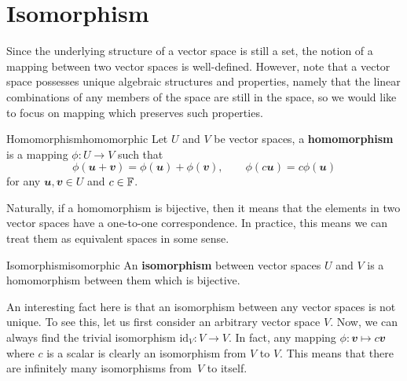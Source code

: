 \documentclass[math, code]{amznotes}
\theoremstyle{remark}
\begin{document}
\section{Isomorphism}
Since the underlying structure of a vector space is still a set, the notion of a mapping between two vector spaces is well-defined. However, note that a vector space possesses unique algebraic structures and properties, namely that the linear combinations of any members of the space are still in the space, so we would like to focus on mapping which preserves such properties.
\begin{dfnbox}{Homomorphism}{homomorphic}
    Let $U$ and $V$ be vector spaces, a {\color{red} \textbf{homomorphism}} is a mapping $\phi \colon U \to V$ such that
    \begin{equation*}
        \phi(\mathbfit{u + v}) = \phi(\mathbfit{u}) + \phi(\mathbfit{v}), \qquad \phi(c\mathbfit{u}) = c\phi(\mathbfit{u})
    \end{equation*}
    for any $\mathbfit{u}, \mathbfit{v} \in U$ and $c \in \mathbb{F}$.
\end{dfnbox}
Naturally, if a homomorphism is bijective, then it means that the elements in two vector spaces have a one-to-one correspondence. In practice, this means we can treat them as equivalent spaces in some sense.
\begin{dfnbox}{Isomorphism}{isomorphic}
    An {\color{red} \textbf{isomorphism}} between vector spaces $U$ and $V$ is a homomorphism between them which is bijective.
\end{dfnbox}
An interesting fact here is that an isomorphism between any vector spaces is not unique. To see this, let us first consider an arbitrary vector space $V$. Now, we can always find the trivial isomorphism $\mathrm{id}_V \colon V \to V$. In fact, any mapping $\phi \colon \mathbfit{v} \mapsto c\mathbfit{v}$ where $c$ is a scalar is clearly an isomorphism from $V$ to $V$. This means that there are infinitely many isomorphisms from~$V$ to itself.
\end{document}
